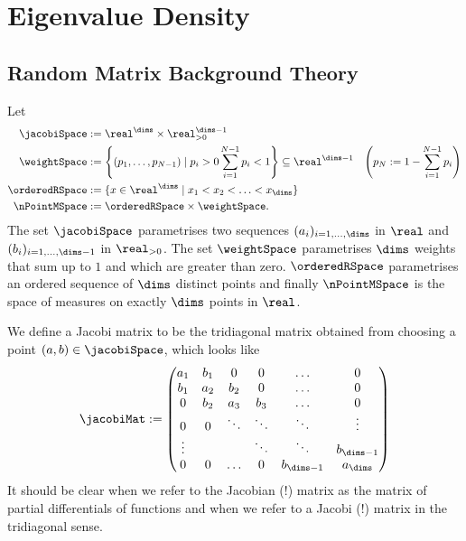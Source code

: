 
\section{Eigenvalue Density}

\subsection{Random Matrix Background Theory}

\begin{definition}[Spaces]\label{def: differenSpacesForRMT}
    Let 
    \begin{align*}
        \jacobiSpace & := \real^\dims\times\real^{\dims-1}_{>0} \\
        \weightSpace & := \left\{ (p_1, \ldots, p_{N-1}) \mid p_i > 0 \sum_{i=1}^{N-1}p_i < 1 \right\} \subseteq \real^{\dims-1} & \left( p_N := 1-\sum_{i=1}^{N-1} p_i \right) \\
        \orderedRSpace & := \{ x\in\real^\dims \mid x_1 < x_2 < \ldots < x_\dims \} \\
        \nPointMSpace & := \orderedRSpace \times \weightSpace.
    \end{align*}
    The set $\jacobiSpace$ parametrises two sequences $(a_i)_{i=1,\ldots,\dims}$ in $\real$ and $(b_i)_{i=1,\ldots,\dims-1}$ in $\real_{>0}$. The set $\weightSpace$ parametrises $\dims$ weights that sum up to $1$ and which are greater than zero. $\orderedRSpace$ parametrises an ordered sequence of $\dims$ distinct points and finally $\nPointMSpace$ is the space of measures on exactly $\dims$ points in $\real$.
\end{definition}

\begin{definition}
    We define a Jacobi matrix to be the tridiagonal matrix obtained from choosing a point $(a,b) \in \jacobiSpace$, which looks like
    \begin{align*}
        \jacobiMat :=
        \begin{pmatrix}
            a_1    & b_1 & 0      & 0      & \ldots           & 0                \\
            b_1    & a_2 & b_2    & 0      & \ldots           & 0                \\
            0      & b_2 & a_3    & b_3    & \ldots           & 0                \\
            0      & 0   & \ddots & \ddots & \ddots           & \vdots           \\
            \vdots &     &        & \ddots & \ddots           & b_{\dims-1} \\
            0      &  0  & \ldots & 0      & b_{\dims-1} & a_{\dims}   
        \end{pmatrix}
    \end{align*}
    It should be clear when we refer to the Jacobian (!) matrix as the matrix of partial differentials of functions and when we refer to a Jacobi (!) matrix in the tridiagonal sense.
\end{definition}

